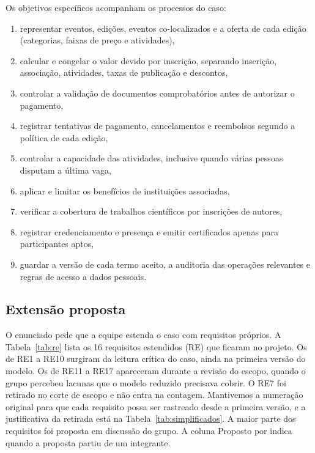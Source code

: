 Os objetivos específicos acompanham os processos do caso:
\begin{enumerate}
  \item representar eventos, edições, eventos co-localizados e a oferta de cada edição (categorias, faixas de preço e atividades),
  \item calcular e congelar o valor devido por inscrição, separando inscrição, associação, atividades, taxas de publicação e descontos,
  \item controlar a validação de documentos comprobatórios antes de autorizar o pagamento,
  \item registrar tentativas de pagamento, cancelamentos e reembolsos segundo a política de cada edição,
  \item controlar a capacidade das atividades, inclusive quando várias pessoas disputam a última vaga,
  \item aplicar e limitar os benefícios de instituições associadas,
  \item verificar a cobertura de trabalhos científicos por inscrições de autores,
  \item registrar credenciamento e presença e emitir certificados apenas para participantes aptos,
  \item guardar a versão de cada termo aceito, a auditoria das operações relevantes e regras de acesso a dados pessoais.
\end{enumerate}

\subsection{Extensão proposta}

O enunciado pede que a equipe estenda o caso com requisitos próprios. A Tabela~\ref{tab:re} lista os 16 requisitos estendidos (RE) que ficaram no projeto. Os de RE1 a RE10 surgiram da leitura crítica do caso, ainda na primeira versão do modelo. Os de RE11 a RE17 apareceram durante a revisão do escopo, quando o grupo percebeu lacunas que o modelo reduzido precisava cobrir. O RE7 foi retirado no corte de escopo e não entra na contagem. Mantivemos a numeração original para que cada requisito possa ser rastreado desde a primeira versão, e a justificativa da retirada está na Tabela~\ref{tab:simplificados}. A maior parte dos requisitos foi proposta em discussão do grupo. A coluna Proposto por indica quando a proposta partiu de um integrante.

